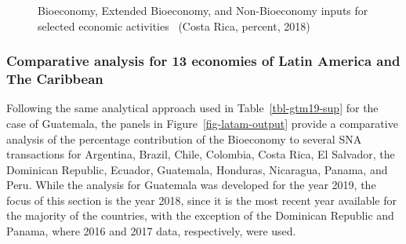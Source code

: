 \documentclass[
  letterpaper,
  DIV=11,
  numbers=noendperiod]{scrartcl}
\begin{document}
\begin{figure}
\begin{minipage}{0.33\linewidth}
{}


\end{minipage}%
%
\begin{minipage}{0.33\linewidth}



\end{minipage}%

\caption{\label{fig-cri-sectoral}Bioeconomy, Extended Bioeconomy, and
Non-Bioeconomy inputs for selected economic activities~ (Costa Rica,
percent, 2018)}

\end{figure}%

\subsubsection{Comparative analysis for 13 economies of Latin America
and The
Caribbean}\label{comparative-analysis-for-13-economies-of-latin-america-and-the-caribbean}

Following the same analytical approach used in Table~\ref{tbl-gtm19-sup}
for the case of Guatemala, the panels in Figure~\ref{fig-latam-output}
provide a comparative analysis of the percentage contribution of the
Bioeconomy to several SNA transactions for Argentina, Brazil, Chile,
Colombia, Costa Rica, El Salvador, the Dominican Republic, Ecuador,
Guatemala, Honduras, Nicaragua, Panama, and Peru. While the analysis for
Guatemala was developed for the year 2019, the focus of this section is
the year 2018, since it is the most recent year available for the
majority of the countries, with the exception of the Dominican Republic
and Panama, where 2016 and 2017 data, respectively, were used.
\end{document}
